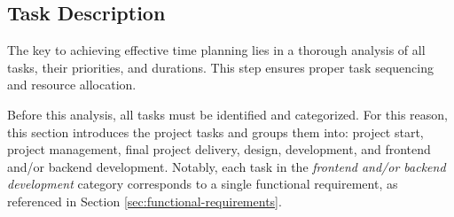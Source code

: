 \subsection{Task Description}
\label{sec:taskdescription}

The key to achieving effective time planning lies in a thorough analysis of all tasks, their priorities, and durations. This step ensures proper task sequencing and resource allocation. 

Before this analysis, all tasks must be identified and categorized. For this reason, this section introduces the project tasks and groups them into: project start, project management, final project delivery, design, development, and frontend and/or backend development. Notably, each task in the \textit{frontend and/or backend development} category corresponds to a single functional requirement, as referenced in Section \ref{sec:functional-requirements}.




 


 
 